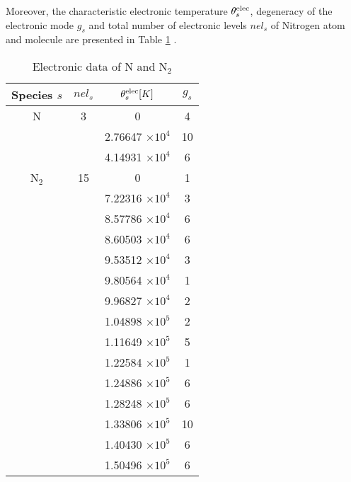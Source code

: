 Moreover, the characteristic electronic temperature $\theta^{\text{elec}}_s$, degeneracy of the electronic mode  $g_s$ and total number of electronic levels $nel_s$ of Nitrogen atom and molecule are presented in Table \ref{table02} \citep{Kirk2009}.
\begin{table}[ht]
\caption{Electronic data of N and N$_2$}
\centering
\begin{tabular}{c c c c}
\hline\hline
Species $s$  &  $nel_s$ & $\theta_{s}^{\text{elec}} [K]$ & $g_s$ \\ [0.5ex]
\hline 
N & 3 &  0   &    4  \\
& &	  2.76647 $\times 10^4$     & 10  \\
& &	  4.14931 $\times 10^4$     & 6  \\
\hline
N$_2$ & 15  &  0  &    1  \\
& &       7.22316 $\times 10^4$  &    3  \\
& &       8.57786 $\times 10^4$  &    6  \\
& &       8.60503 $\times 10^4$  &    6  \\
& &       9.53512 $\times 10^4$  &    3  \\
& &       9.80564 $\times 10^4$  &    1  \\
& &       9.96827 $\times 10^4$  &    2  \\
& &       1.04898 $\times 10^5$  &    2  \\
& &       1.11649 $\times 10^5$  &    5  \\
& &       1.22584 $\times 10^5$  &    1  \\
& &       1.24886 $\times 10^5$  &    6  \\
& &       1.28248 $\times 10^5$  &    6  \\
& &       1.33806 $\times 10^5$  &   10  \\
& &       1.40430 $\times 10^5$  &    6  \\
& &       1.50496 $\times 10^5$  &    6  \\ [.5ex]
\hline
\end{tabular}
\label{table02}
\end{table} 


